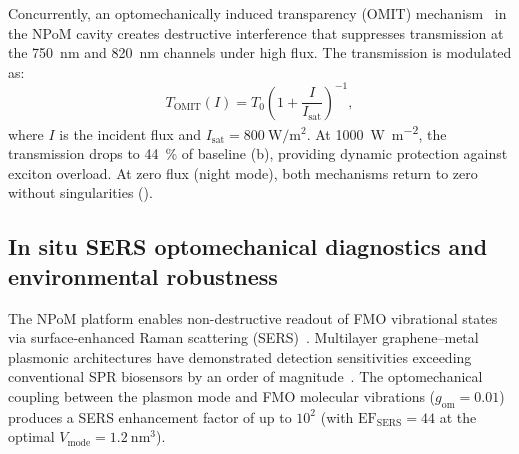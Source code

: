 \documentclass[onecolumn,a4paper,12pt]{article}
\begin{document}
Concurrently, an optomechanically induced transparency (OMIT) mechanism~\cite{Aspelmeyer2014} in the NPoM cavity creates destructive interference that suppresses transmission at the \qty{750}{\nm} and \qty{820}{\nm} channels under high flux.
The transmission is modulated as:
\begin{equation}
T_{\mathrm{OMIT}}(I) = T_0 \left(1 + \frac{I}{I_{\mathrm{sat}}}\right)^{-1},
\label{eq:omit}
\end{equation}
where $I$ is the incident flux and $I_{\mathrm{sat}} = \qty{800}{\W\per\m\squared}$.
At \qty{1000}{\W\per\m\squared}, the transmission drops to \qty{44}{\percent} of baseline (b), providing dynamic protection against exciton overload.
At zero flux (night mode), both mechanisms return to zero without singularities ().

\subsection*{In situ SERS optomechanical diagnostics and environmental robustness}

The NPoM platform enables non-destructive readout of FMO vibrational states via surface-enhanced Raman scattering (SERS)~\cite{Langer2020}.
Multilayer graphene--metal plasmonic architectures have demonstrated detection sensitivities exceeding conventional SPR biosensors by an order of magnitude~\cite{Bahmani2026}.
The optomechanical coupling between the plasmon mode and FMO molecular vibrations ($g_{\mathrm{om}} = 0.01$) produces a SERS enhancement factor of up to $10^2$ (with $\mathrm{EF}_{\mathrm{SERS}} = 44$ at the optimal $V_{\mathrm{mode}} = \qty{1.2}{\nm\cubed}$).
\end{document}
